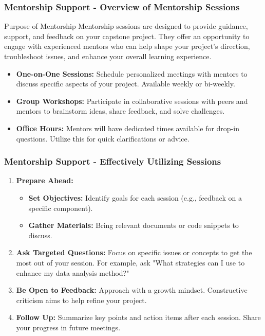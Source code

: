 \documentclass[aspectratio=169]{beamer}
\begin{document}
\begin{frame}[fragile]
    \frametitle{Mentorship Support - Overview of Mentorship Sessions}
    \begin{block}{Purpose of Mentorship}
        Mentorship sessions are designed to provide guidance, support, and feedback on your capstone project. They offer an opportunity to engage with experienced mentors who can help shape your project's direction, troubleshoot issues, and enhance your overall learning experience.
    \end{block}
    
    \begin{itemize}
        \item \textbf{One-on-One Sessions:} Schedule personalized meetings with mentors to discuss specific aspects of your project. Available weekly or bi-weekly.
        \item \textbf{Group Workshops:} Participate in collaborative sessions with peers and mentors to brainstorm ideas, share feedback, and solve challenges.
        \item \textbf{Office Hours:} Mentors will have dedicated times available for drop-in questions. Utilize this for quick clarifications or advice.
    \end{itemize}
\end{frame}

\begin{frame}[fragile]
    \frametitle{Mentorship Support - Effectively Utilizing Sessions}
    \begin{enumerate}
        \item \textbf{Prepare Ahead:}
        \begin{itemize}
            \item \textbf{Set Objectives:} Identify goals for each session (e.g., feedback on a specific component).
            \item \textbf{Gather Materials:} Bring relevant documents or code snippets to discuss.
        \end{itemize}
        
        \item \textbf{Ask Targeted Questions:} Focus on specific issues or concepts to get the most out of your session. For example, ask "What strategies can I use to enhance my data analysis method?"
        
        \item \textbf{Be Open to Feedback:} Approach with a growth mindset. Constructive criticism aims to help refine your project.
        
        \item \textbf{Follow Up:} Summarize key points and action items after each session. Share your progress in future meetings.
    \end{enumerate}
\end{frame}
\end{document}
